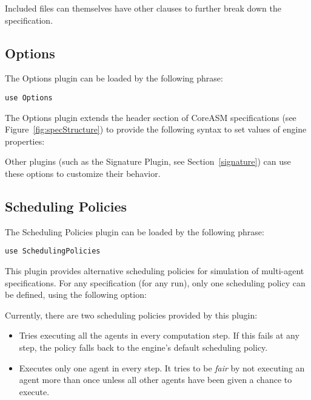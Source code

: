 \documentclass{article}
\newcommand{\CoreASM}{{\sffamily CoreASM}\xspace}
\begin{document}
Included files can themselves have other  clauses to further break down the specification.

\subsection{Options}
\label{options}

The Options plugin can be loaded by the following  phrase:

\begin{lstlisting}
use Options
\end{lstlisting}

\noindent The Options plugin extends the header section of \CoreASM specifications (see Figure~\ref{fig:specStructure}) to provide the following syntax to set values of engine properties: 

\begin{quote} \end{quote}

Other plugins (such as the Signature Plugin, see Section~\ref{signature}) can use these options to customize their behavior.

\subsection{Scheduling Policies}
\label{scheduling}

The Scheduling Policies plugin can be loaded by the following  phrase:

\begin{lstlisting}
use SchedulingPolicies
\end{lstlisting}

This plugin provides alternative scheduling policies for simulation of multi-agent specifications. For any specification (for any run), only one scheduling policy can be defined, using the following option:
\begin{quote}  \end{quote}

Currently, there are two scheduling policies provided by this plugin:
\begin{itemize}
  \item {} Tries executing all the agents in every computation step. If this fails at any step,	the policy falls back to the engine's default scheduling policy.

  \item {} Executes only one agent in every step. It tries to be {\em fair} by not executing an agent more than once unless all other agents have been given a chance to execute.

\end{itemize}
\end{document}
